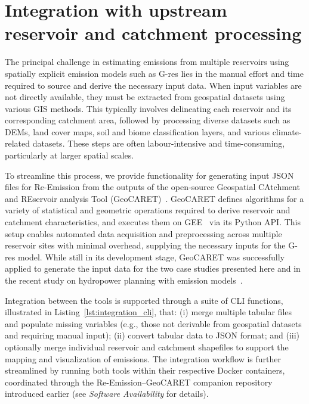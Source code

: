 \documentclass[review, authoryear, 1p]{elsarticle} %
\begin{document}
\section{Integration with upstream reservoir and catchment processing}
\label{sec:integration}

The principal challenge in estimating emissions from multiple reservoirs using spatially explicit emission models such as G-res lies in the manual effort and time required to source and derive the necessary input data.
When input variables are not directly available, they must be extracted from geospatial datasets using various \ac{GIS} methods.
This typically involves delineating each reservoir and its corresponding catchment area, followed by processing diverse datasets such as \acp{DEM}, land cover maps, soil and biome classification layers, and various climate-related datasets.
These steps are often labour-intensive and time-consuming, particularly at larger spatial scales.

To streamline this process, we provide functionality for generating input JSON files for Re-Emission from the outputs of the open-source Geospatial CAtchment and REservoir analysis Tool (GeoCARET)~\cite{heettool}.
GeoCARET defines algorithms for a variety of statistical and geometric operations required to derive reservoir and catchment characteristics, and executes them on \ac{GEE}~\cite{Gorelick2017} via its Python API.
This setup enables automated data acquisition and preprocessing across multiple reservoir sites with minimal overhead, supplying the necessary inputs for the G-res model.
While still in its development stage, GeoCARET was successfully applied to generate the input data for the two case studies presented here and in the recent study on hydropower planning with emission models~\citep{janus2025planning}.

Integration between the tools is supported through a suite of \ac{CLI} functions, illustrated in Listing~\ref{lst:integration_cli}, that:
(i) merge multiple tabular files and populate missing variables (e.g., those not derivable from geospatial datasets and requiring manual input);
(ii) convert tabular data to JSON format; and
(iii) optionally merge individual reservoir and catchment shapefiles to support the mapping and visualization of emissions.
The integration workflow is further streamlined by running both tools within their respective Docker containers, coordinated through the Re-Emission--GeoCARET companion repository~\cite{janus_geocaret_reemission} introduced earlier (see \emph{Software Availability} for details).
\end{document}
